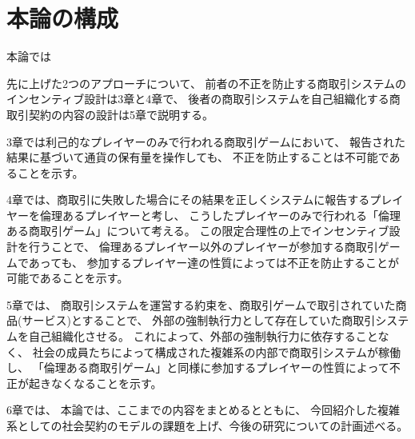 


 


  \section{本論の構成}
  本論では

  先に上げた2つのアプローチについて、
  前者の不正を防止する商取引システムのインセンティブ設計は3章と4章で、
  後者の商取引システムを自己組織化する商取引契約の内容の設計は5章で説明する。

  3章では利己的なプレイヤーのみで行われる商取引ゲームにおいて、
  報告された結果に基づいて通貨の保有量を操作しても、
  不正を防止することは不可能であることを示す。

  4章では、商取引に失敗した場合にその結果を正しくシステムに報告するプレイヤーを倫理あるプレイヤーと考し、
  こうしたプレイヤーのみで行われる「倫理ある商取引ゲーム」について考える。
  この限定合理性の上でインセンティブ設計を行うことで、
  倫理あるプレイヤー以外のプレイヤーが参加する商取引ゲームであっても、
  参加するプレイヤー達の性質によっては不正を防止することが可能であることを示す。

  5章では、
  商取引システムを運営する約束を、商取引ゲームで取引されていた商品(サービス)とすることで、
  外部の強制執行力として存在していた商取引システムを自己組織化させる。
  これによって、外部の強制執行力に依存することなく、
  社会の成員たちによって構成された複雑系の内部で商取引システムが稼働し、
  「倫理ある商取引ゲーム」と同様に参加するプレイヤーの性質によって不正が起きなくなることを示す。
  
  6章では、
  本論では、ここまでの内容をまとめるとともに、
  今回紹介した複雑系としての社会契約のモデルの課題を上げ、今後の研究についての計画述べる。

